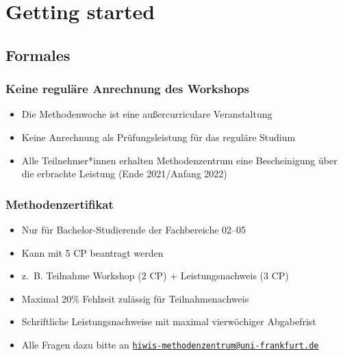 \documentclass[
  ngerman,
]{article}
\providecommand{\tightlist}{%
  \setlength{\itemsep}{0pt}\setlength{\parskip}{0pt}}
\begin{document}
\hypertarget{getting-started}{%
\section{Getting started}\label{getting-started}}

\hypertarget{formales}{%
\subsection{Formales}\label{formales}}

\hypertarget{keine-reguluxe4re-anrechnung-des-workshops}{%
\subsubsection{Keine reguläre Anrechnung des Workshops}\label{keine-reguluxe4re-anrechnung-des-workshops}}

\begin{itemize}
\tightlist
\item
  Die Methodenwoche ist eine außercurriculare Veranstaltung
\item
  Keine Anrechnung als Prüfungsleistung für das reguläre Studium
\item
  Alle Teilnehmer*innen erhalten Methodenzentrum eine Bescheinigung über die erbrachte Leistung (Ende 2021/Anfang 2022)
\end{itemize}

\hypertarget{methodenzertifikat}{%
\subsubsection{Methodenzertifikat}\label{methodenzertifikat}}

\begin{itemize}
\tightlist
\item
  Nur für Bachelor-Studierende der Fachbereiche 02--05
\item
  Kann mit 5 CP beantragt werden
\item
  z.~B. Teilnahme Workshop (2 CP) + Leistungsnachweis (3 CP)
\item
  Maximal 20\% Fehlzeit zulässig für Teilnahmenachweis
\item
  Schriftliche Leistungsnachweise mit maximal vierwöchiger Abgabefrist
\item
  Alle Fragen dazu bitte an \href{mailto:hiwis-methodenzentrum@uni-frankfurt.de}{\nolinkurl{hiwis-methodenzentrum@uni-frankfurt.de}}
\end{itemize}
\end{document}
